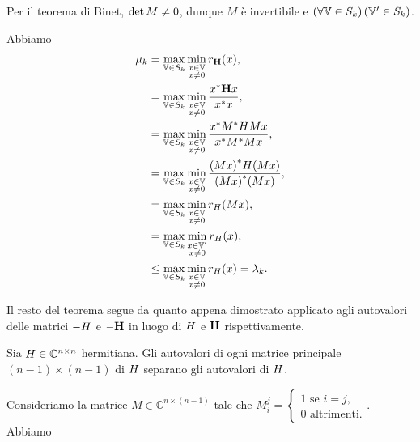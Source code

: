 \par Per il teorema di Binet, $\operatorname{det}{M} \neq 0$, dunque $M$ \`e invertibile e $\left ( \forall \mathbb{V} \in S_k \right ) \left ( \mathbb{V}' \in S_k \right )$.
\par Abbiamo
\begin{align*}
	\mu_k
	&= \max_{\mathbb{V} \in S_k} \min_{\substack{x \in \mathbb{V}\\x \neq 0}} r_{\mathbf{H}}(x),\\
	&= \max_{\mathbb{V} \in S_k} \min_{\substack{x \in \mathbb{V}\\x \neq 0}} \frac{{x}^* \mathbf{H} x}{{x}^* x},\\
	&= \max_{\mathbb{V} \in S_k} \min_{\substack{x \in \mathbb{V}\\x \neq 0}} \frac{{x}^* {M}^* H M x}{{x}^* {M}^*M x},\\
	&= \max_{\mathbb{V} \in S_k} \min_{\substack{x \in \mathbb{V}\\x \neq 0}} \frac{{(Mx)}^* H (Mx)}{{(Mx)}^*(Mx)},\\
	&= \max_{\mathbb{V} \in S_k} \min_{\substack{x \in \mathbb{V}\\x \neq 0}} r_H(Mx),\\
	&= \max_{\mathbb{V} \in S_k} \min_{\substack{x \in \mathbb{V}'\\x \neq 0}} r_H(x),\\
	&\leq \max_{\mathbb{V} \in S_k} \min_{\substack{x \in \mathbb{V}\\x \neq 0}} r_H(x) = \lambda_k.
\end{align*}
\par Il resto del teorema segue da quanto appena dimostrato applicato agli autovalori delle matrici $- H$ e $- \mathbf{H}$ in luogo di $H$ e $\mathbf{H}$ rispettivamente. \EndProof
\begin{Corollary}
	Sia $H \in \mathbb{C}^{n \times n}$ hermitiana. Gli autovalori di ogni matrice principale $(n - 1) \times (n - 1)$ di $H$ separano gli autovalori di $H$.
\end{Corollary}
\Proof Consideriamo la matrice $M \in \mathbb{C}^{n \times (n - 1)}$ tale che $M_i^j = \begin{cases}1\text{ se }i = j,\\0\text{ altrimenti.}\end{cases}$. Abbiamo
